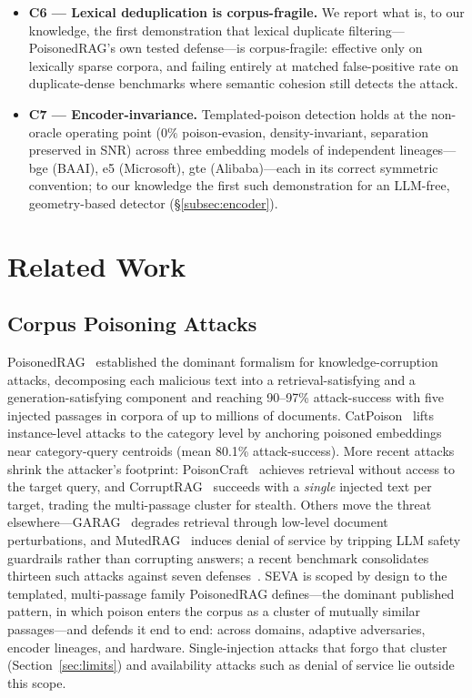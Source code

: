 \documentclass[10pt,journal,compsoc]{IEEEtran}
\begin{document}
\begin{itemize}
\item \textbf{C6 --- Lexical deduplication is corpus-fragile.} We report what is, to our
knowledge, the first demonstration that lexical duplicate filtering---PoisonedRAG's own tested
defense---is corpus-fragile: effective only on lexically sparse corpora, and failing entirely at
matched false-positive rate on duplicate-dense benchmarks where semantic cohesion still detects
the attack.

\item \textbf{C7 --- Encoder-invariance.} Templated-poison detection holds at the non-oracle
operating point ($0\%$ poison-evasion, density-invariant, separation preserved in SNR) across
three embedding models of independent lineages---bge (BAAI), e5 (Microsoft), gte (Alibaba)---each
in its correct symmetric convention; to our knowledge the first such demonstration for an
LLM-free, geometry-based detector (\S\ref{subsec:encoder}).
\end{itemize}

\section{Related Work}
\label{sec:related}

\subsection{Corpus Poisoning Attacks}
PoisonedRAG~\cite{poisonedrag} established the dominant formalism for
knowledge-corruption attacks, decomposing each malicious text into a
retrieval-satisfying and a generation-satisfying component and reaching 90--97\%
attack-success with five injected passages in corpora of up to millions of
documents. CatPoison~\cite{catpoison} lifts instance-level attacks to the
category level by anchoring poisoned embeddings near category-query centroids
(mean 80.1\% attack-success). More recent attacks shrink the
attacker's footprint: PoisonCraft~\cite{poisoncraft} achieves retrieval without
access to the target query, and CorruptRAG~\cite{corruptrag} succeeds with a
\emph{single} injected text per target, trading the multi-passage cluster for
stealth. Others move the threat elsewhere---GARAG~\cite{garag} degrades retrieval
through low-level document perturbations, and MutedRAG~\cite{mutedrag} induces
denial of service by tripping LLM safety guardrails rather than corrupting
answers; a recent benchmark consolidates thirteen such attacks against seven
defenses~\cite{ragpoisonbench}. SEVA is scoped by design to the templated,
multi-passage family PoisonedRAG defines---the dominant published pattern, in which
poison enters the corpus as a cluster of mutually similar passages---and defends it
end to end: across domains, adaptive adversaries, encoder lineages, and hardware.
Single-injection attacks that forgo that cluster (Section~\ref{sec:limits}) and
availability attacks such as denial of service lie outside this scope.
\end{document}
